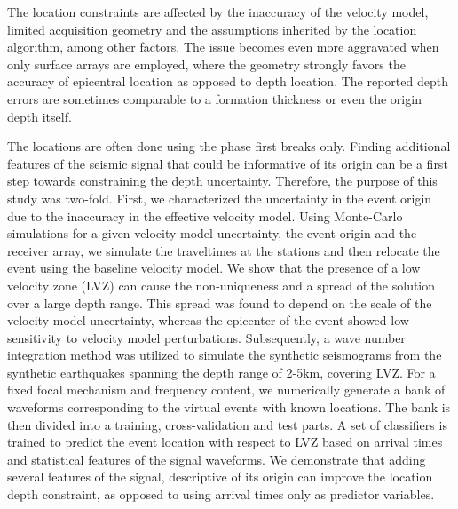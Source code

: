 The location constraints are affected by the inaccuracy of the velocity model, limited acquisition geometry and the assumptions inherited by the location algorithm, among other factors. The issue becomes even more aggravated when only surface arrays are employed, where the geometry strongly favors the accuracy of epicentral location as opposed to depth location. The reported depth errors are sometimes comparable to a formation thickness or even the origin depth itself.

The locations are often done using the phase first breaks only. Finding additional features of the seismic signal that could be informative of its origin can be a first step towards constraining the depth uncertainty. Therefore, the purpose of this study was two-fold. First, we characterized the uncertainty in the event origin due to the inaccuracy in the effective velocity model. Using Monte-Carlo simulations for a given velocity model uncertainty, the event origin and the receiver array, we simulate the traveltimes at the stations and then relocate the event using the baseline velocity model. We show that the presence of a low velocity zone (LVZ) can cause the non-uniqueness and a spread of the solution over a large depth range. This spread was found to depend on the scale of the velocity model uncertainty, whereas the epicenter of the event showed low sensitivity to velocity model perturbations. Subsequently, a wave number integration method was utilized to simulate the synthetic seismograms from the synthetic earthquakes spanning the depth range of 2-5km, covering LVZ. For a fixed focal mechanism and frequency content, we numerically generate a bank of waveforms corresponding to the virtual events with known locations. The bank is then divided into a training, cross-validation and test parts. A set of classifiers is trained to predict the event location with respect to LVZ based on arrival times and statistical features of the signal waveforms. We demonstrate that adding several features of the signal, descriptive of its origin can improve the location depth constraint, as opposed to using arrival times only as predictor variables.
%
